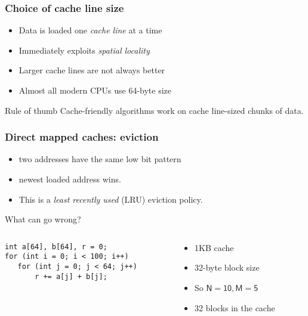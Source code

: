 \documentclass[dvipsnames,presentation,aspectratio=169,14pt]{beamer}
\begin{document}
\begin{frame}
  \frametitle{Choice of cache line size}
  \begin{itemize}[itemsep=8pt]
  \item Data is loaded one \emph{cache line} at a time
  \item Immediately exploits \emph{spatial locality}
  \item Larger cache lines are not always better
  \item Almost all modern CPUs use 64-byte size
  \end{itemize}

  \vskip 16pt

  \begin{block}{Rule of thumb}
    Cache-friendly algorithms work on cache line-sized chunks of data.
  \end{block}
\end{frame}

\begin{frame}[fragile]
  \frametitle{Direct mapped caches: eviction}
  \begin{itemize}[itemsep=4pt]
  \item {} two addresses have the same low bit pattern
  \item {} newest loaded address wins.
  \item This is a \emph{least recently used} (LRU) eviction policy.
  \end{itemize}

  \pause

  \begin{block}{What can go wrong?}
    \begin{columns}
      \begin{column}{0.45\textwidth}
\begin{verbatim}
int a[64], b[64], r = 0;
for (int i = 0; i < 100; i++)
   for (int j = 0; j < 64; j++)
       r += a[j] + b[j];
\end{verbatim}
      \end{column}
      \begin{column}{0.45\textwidth}
        \begin{itemize}
        \item 1KB cache
        \item 32-byte block size
        \item So $\mathsf{N=10, M=5}$
        \item 32 blocks in the cache
        \end{itemize}
      \end{column}
    \end{columns}
  \end{block}
\end{frame}
\end{document}
